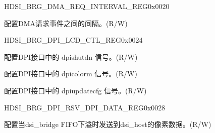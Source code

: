 \begin{register}{H}{DSI\_BRG\_DMA\_REQ\_INTERVAL\_REG}{0x0020}\label{regdesc:DSIBRGDMAREQINTERVALREG}
%
%
\regnewline%
\begin{regdesc}\begin{reglist}
\label{fielddesc:DSIBRGDMAREQINTERVAL}\item [DSI\_BRG\_DMA\_REQ\_INTERVAL] 配置DMA请求事件之间的间隔。(R/W)
\end{reglist}\end{regdesc}
\end{register}


\begin{register}{H}{DSI\_BRG\_DPI\_LCD\_CTL\_REG}{0x0024}\label{regdesc:DSIBRGDPILCDCTLREG}
%
%
%
%
\regnewline%
\begin{regdesc}\begin{reglist}
\label{fielddesc:DSIBRGDPISHUTDN}\item [DSI\_BRG\_DPISHUTDN] 配置DPI接口中的 dpishutdn 信号。(R/W)
\label{fielddesc:DSIBRGDPICOLORM}\item [DSI\_BRG\_DPICOLORM] 配置DPI接口中的 dpicolorm 信号。(R/W)
\label{fielddesc:DSIBRGDPIUPDATECFG}\item [DSI\_BRG\_DPIUPDATECFG] 配置DPI接口中的 dpiupdatecfg 信号。(R/W)
\end{reglist}\end{regdesc}
\end{register}


\begin{register}{H}{DSI\_BRG\_DPI\_RSV\_DPI\_DATA\_REG}{0x0028}\label{regdesc:DSIBRGDPIRSVDPIDATAREG}
%
%
\regnewline%
\begin{regdesc}\begin{reglist}
\label{fielddesc:DSIBRGDPIRSVDATA}\item [DSI\_BRG\_DPI\_RSV\_DATA] 配置当dsi\_bridge FIFO下溢时发送到dsi\_host的像素数据。(R/W)
\end{reglist}\end{regdesc}
\end{register}


